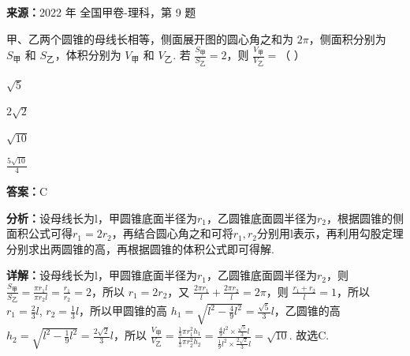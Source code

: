 \begin{question}[points=5]
\textbf{来源：}2022 年 全国甲卷-理科，第 9 题\par
甲、乙两个圆锥的母线长相等，侧面展开图的圆心角之和为 $2\pi$，侧面积分别为 $S_\text{甲}$ 和 $S_\text{乙}$，体积分别为 $V_\text{甲}$ 和 $V_\text{乙}$. 若 $\frac{S_\text{甲}}{S_\text{乙}}=2$，则 $\frac{V_\text{甲}}{V_\text{乙}}=$（ ）
\begin{choices}
  \item $\sqrt{5}$
  \item $2\sqrt{2}$
  \item $\sqrt{10}$
  \item $\frac{5\sqrt{10}}{4}$
\end{choices}
\begin{solution}
\textbf{答案：}C

\textbf{分析：}设母线长为l，甲圆锥底面半径为$r_1$，乙圆锥底面圆半径为$r_2$，根据圆锥的侧面积公式可得$r_1=2r_2$，再结合圆心角之和可将$r_1,r_2$分别用l表示，再利用勾股定理分别求出两圆锥的高，再根据圆锥的体积公式即可得解.

\textbf{详解：}设母线长为l，甲圆锥底面半径为$r_1$，乙圆锥底面圆半径为$r_2$，则 $\frac{S_\text{甲}}{S_\text{乙}}=\frac{\pi r_1 l}{\pi r_2 l}=\frac{r_1}{r_2}=2$，所以 $r_1=2r_2$，又 $\frac{2\pi r_1}{l}+\frac{2\pi r_2}{l}=2\pi$，则 $\frac{r_1+r_2}{l}=1$，所以 $r_1=\frac{2}{3}l$, $r_2=\frac{1}{3}l$，所以甲圆锥的高 $h_1=\sqrt{l^2-\frac{4}{9}l^2}=\frac{\sqrt{5}}{3}l$，乙圆锥的高 $h_2=\sqrt{l^2-\frac{1}{9}l^2}=\frac{2\sqrt{2}}{3}l$，所以 $\frac{V_\text{甲}}{V_\text{乙}}=\frac{\frac{1}{3}\pi r_1^2 h_1}{\frac{1}{3}\pi r_2^2 h_2}=\frac{\frac{4}{9}l^2 \times \frac{\sqrt{5}}{3}l}{\frac{1}{9}l^2 \times \frac{2\sqrt{2}}{3}l}=\sqrt{10}$. 故选C.
\end{solution}
\end{question}

